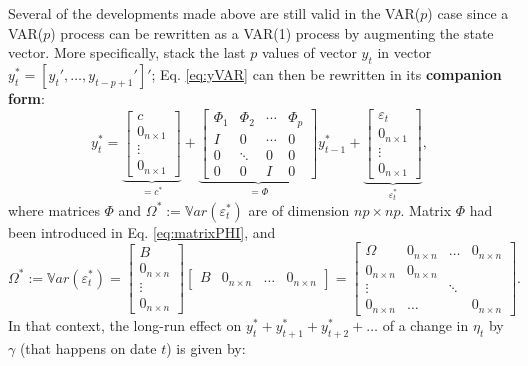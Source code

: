 \documentclass[
  12pt,
]{book}
\theoremstyle{definition}
\theoremstyle{definition}
\theoremstyle{definition}
\theoremstyle{definition}
\theoremstyle{remark}
\begin{document}
Several of the developments made above are still valid in the VAR(\(p\)) case since a VAR(\(p\)) process can be rewritten as a VAR(1) process by augmenting the state vector. More specifically, stack the last \(p\) values of vector \(y_t\) in vector \(y_{t}^{*}=[y_t',\dots,y_{t-p+1}']'\); Eq. \eqref{eq:yVAR} can then be rewritten in its \textbf{companion form}:
\begin{equation}
y_{t}^{*} =
\underbrace{\left[\begin{array}{c}
c\\
0_{n \times 1}\\
\vdots\\
0_{n \times 1}\end{array}\right]}_{=c^*}+
\underbrace{\left[\begin{array}{cccc}
\Phi_{1} & \Phi_{2} & \cdots & \Phi_{p}\\
I & 0 & \cdots & 0\\
0 & \ddots & 0 & 0\\
0 & 0 & I & 0\end{array}\right]}_{=\Phi}
y_{t-1}^{*}+
\underbrace{\left[\begin{array}{c}
\varepsilon_{t}\\
0_{n \times 1}\\
\vdots\\
0_{n \times 1}\end{array}\right]}_{\varepsilon_t^*},\label{eq:ystarVAR}
\end{equation}
where matrices \(\Phi\) and \(\Omega^*:= \mathbb{V}ar(\varepsilon_t^*)\) are of dimension \(np \times np\). Matrix \(\Phi\) had been introduced in Eq. \eqref{eq:matrixPHI}, and
\[
\Omega^* := \mathbb{V}ar(\varepsilon_t^*)=
\left[\begin{array}{c}
B \\
0_{n \times n}  \\
\vdots \\
0_{n \times n}
\end{array}\right]\left[\begin{array}{cccc}
B & 0_{n \times n} & \dots & 0_{n \times n}
\end{array}\right]
= \left[\begin{array}{cccc}
\Omega & 0_{n \times n} & \dots & 0_{n \times n} \\
0_{n \times n} & 0_{n \times n} \\
\vdots &&\ddots\\
0_{n \times n} & \dots &&0_{n \times n}
\end{array}\right].
\]
In that context, the long-run effect on \(y_t^*+y_{t+1}^*+y_{t+2}^*+\dots\) of a change in \(\eta_t\) by \(\gamma\) (that happens on date \(t\)) is given by:
\end{document}
